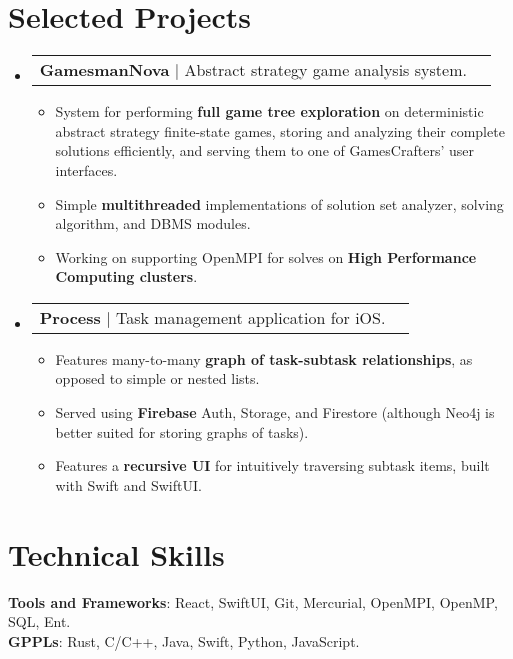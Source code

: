 \documentclass[letterpaper,11pt]{article}
\makeatletter
\newcommand{\resumeItem}[1]{
  \item\small{
    {#1 \vspace{-2pt}}
  }
}
\newcommand{\resumeProjectHeading}[1]{
    \item
    \begin{tabular*}{0.97\textwidth}{l@{\extracolsep{\fill}}r}
      \small#1 \\
    \end{tabular*}\vspace{-7pt}
}
\newcommand{\resumeSubHeadingListStart}{\begin{itemize}[leftmargin=0.15in, label={}]}
\newcommand{\resumeSubHeadingListEnd}{\end{itemize}}
\newcommand{\resumeItemListStart}{\begin{itemize}}
\newcommand{\resumeItemListEnd}{\end{itemize}\vspace{-5pt}}
\makeatother
\begin{document}
\section{Selected Projects}
    \resumeSubHeadingListStart
          \resumeProjectHeading
          {\textbf{GamesmanNova} $|$ Abstract strategy game analysis system.}
          \resumeItemListStart
            \resumeItem{System for performing \textbf{full game tree exploration} on deterministic abstract strategy finite-state games, storing and analyzing their complete solutions efficiently, and serving them to one of GamesCrafters' user interfaces.}
            \resumeItem{Simple \textbf{multithreaded} implementations of solution set analyzer, solving algorithm, and DBMS modules.}
            \resumeItem{Working on supporting OpenMPI for solves on \textbf{High Performance Computing clusters}.}
          \resumeItemListEnd
      \resumeProjectHeading
          {\textbf{Process} $|$ Task management application for iOS.}
          \resumeItemListStart
            \resumeItem{Features many-to-many \textbf{graph of task-subtask relationships}, as opposed to simple or nested lists.}
            \resumeItem{Served using \textbf{Firebase} Auth, Storage, and Firestore (although Neo4j is better suited for storing graphs of tasks).}
            \resumeItem{Features a \textbf{recursive UI} for intuitively traversing subtask items, built with Swift and SwiftUI.}
          \resumeItemListEnd
    \resumeSubHeadingListEnd
%
\section{Technical Skills}
 \begin{itemize}[leftmargin=0.15in, label={}]
    \small{\item{
     \textbf{Tools and Frameworks}{: React, SwiftUI, Git, Mercurial, OpenMPI, OpenMP, SQL, Ent.} \\
     \textbf{GPPLs}{: Rust, C/C++, Java, Swift, Python, JavaScript.} \\
    }}
 \end{itemize}


\end{document}

